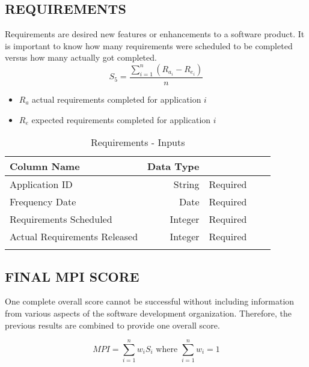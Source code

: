 \documentclass[SDSUThesis.tex]{subfiles}
\begin{document}
\subsection{REQUIREMENTS}
Requirements are desired new features or enhancements to a software product.  It is important to know how many requirements
were scheduled to be completed versus how many actually got completed.  
\[
    S_5 = \frac{\sum^n_{i=1}\left( R_{a_i} - R_{e_i} \right)}{n}
\]
\begin{itemize}
\item $R_a$ actual requirements completed for application $i$
\item $R_e$ expected requirements completed for application $i$
\end{itemize}

\begin{longtable}{@{}l rr rr}

\toprule%
 \centering%
 {\bfseries Column Name}
 & {\bfseries Data Type}
 &  \\

\cmidrule[0.4pt](r{0.125em}){1-1}%
\cmidrule[0.4pt](lr{0.125em}){2-2}%
\cmidrule[0.4pt](l{0.125em}){3-3}%
\endhead

Application ID & String  & Required \\
\myrowcolour%
Frequency Date & Date & Required \\
Requirements Scheduled & Integer & Required \\
\myrowcolour%
Actual Requirements Released & Integer  & Required \\

\bottomrule

\caption{Requirements - Inputs}
\label{tab:req}
\end{longtable}

\subsection{FINAL MPI SCORE}
One complete overall score cannot be successful without including information from various aspects of the software development organization.  Therefore, the previous results
are combined to provide one overall score.

\[
    MPI =\sum\limits^n_{i=1} w_i S_i \text{ where } \sum\limits^n_{i=1} w_i = 1
\]
\end{document}
